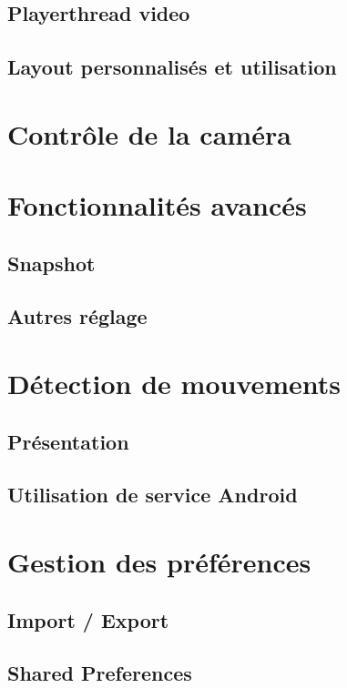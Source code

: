 \subsection{Playerthread video}
\subsection{Layout personnalisés et utilisation}

\section{Contrôle de la caméra}

\section{Fonctionnalités avancés}
\subsection{Snapshot}

\subsection{Autres réglage}


\section{Détection de mouvements}
\subsection{Présentation}

\subsection{Utilisation de service Android}


\section{Gestion des préférences}
\subsection{Import / Export}

\subsection{Shared Preferences}

